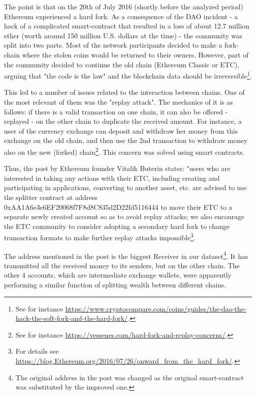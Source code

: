 The point is that on the 20th of July 2016 (shortly before the analyzed period) Ethereum experienced a hard fork.
As a consequence of the DAO incident - a hack of a complicated smart-contract that resulted in a loss of about 12.7 million ether (worth around 150 million U.S. dollars at the time) - the community was split into two parts.
Most of the network participants decided to make a fork-chain where the stolen coins would be returned to their owners.
However, part of the community decided to continue the old chain (Ethereum Classic or ETC), arguing that "the code is the law" and the blockchain data should be irreversible\footnote{See for instance \url{https://www.cryptocompare.com/coins/guides/the-dao-the-hack-the-soft-fork-and-the-hard-fork/}.}.

This led to a number of issues related to the interaction between chains.
One of the most relevant of them was the "replay attack".
The mechanics of it is as follows:
if there is a valid transaction on one chain, it can also be offered - replayed - on the other chain to duplicate the received amount.
For instance, a user of the currency exchange can deposit and withdraw her money from this exchange on the old chain, and then use the 2nd transaction to withdraw money also on the new (forked) chain\footnote{See for instance \url{https://vessenes.com/hard-fork-and-replay-concerns/}.}.
This concern was solved using smart contracts.

Thus, the post by Ethereum founder Vitalik Buterin states:
"users who are interested in taking any actions with their ETC, including creating and participating in applications, converting to another asset, etc. are advised to use the splitter contract at address 0xAA1A6e3e6EF20068f7F8d8C835d2D22fd5116444 to move their ETC to a separate newly created account so as to avoid replay attacks; we also encourage the ETC community to consider adopting a secondary hard fork to change transaction formats to make further replay attacks impossible\footnote{For details see \url{https://blog.Ethereum.org/2016/07/26/onward\_from\_the\_hard\_fork/}.}.

The address mentioned in the post is the biggest Receiver in our dataset\footnote{The original address in the post was changed as the original smart-contract was substituted by the improved one.}.
It has transmitted all the received money to its senders, but on the other chain.
The other 4 accounts, which are intermediate exchange wallets, were apparently performing a similar function of splitting wealth between different chains.

